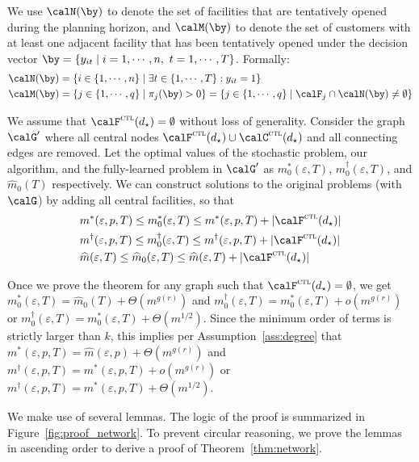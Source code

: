 \documentclass[blindrev]{informs3noheader}
\begin{document}
We use $\calN(\by)$ to denote the set of facilities that are tentatively opened during the planning horizon, and $\calM(\by)$ to denote the set of customers with at least one adjacent facility that has been tentatively opened under the decision vector $\by=\{y_{it}\mid i=1,\cdots,n,\ t=1,\cdots,T\}$. Formally:
\begin{align*}
\calN(\by)&=\{i\in\{1,\cdots,n\} \mid \exists t\in\{1,\cdots,T\}:y_{it}=1\}\\
\calM(\by)&=\{j\in\{1,\cdots,q\} \mid \pi_{j}(\by)>0\}=\left\{j\in\{1,\cdots,q\}\mid\calF_j\cap\calN(\by)\neq\emptyset\right\}
\end{align*}

We assume that $\calF^\textsc{ctl}(d_\star)=\emptyset$ without loss of generality. Consider the graph $\calG'$ where all central nodes $\calF^\textsc{ctl}(d_\star)\cup \calC^\textsc{ctl}(d_\star)$ and all connecting edges are removed. Let the optimal values of the stochastic problem, our algorithm, and the fully-learned problem in $\calG'$ as $m_0^*(\varepsilon, T)$, $m_0^\dagger(\varepsilon, T)$, and $\widehat{m}_0(T)$ respectively. We can construct solutions to the original problems (with $\calG$) by adding all central facilities, so that
\begin{align*}
& m^*(\varepsilon, p,T)\leq m_0^*(\varepsilon, T)\leq m^*(\varepsilon, p,T)+|\calF^\textsc{ctl}(d_\star)|\\
& m^\dagger(\varepsilon, p,T)\leq m_0^\dagger(\varepsilon, T)\leq m^\dagger(\varepsilon, p,T)+|\calF^\textsc{ctl}(d_\star)|\\
& \widehat{m}(\varepsilon, T)\leq \widehat{m}_0(\varepsilon, T)\leq \widehat{m}(\varepsilon, T)+|\calF^\textsc{ctl}(d_\star)|
\end{align*}

Once we prove the theorem for any graph such that $\calF^\textsc{ctl}(d_\star)=\emptyset$, we get $m_0^*(\varepsilon, T)=\widehat{m}_0(T)+\Theta\left(m^{g(r)}\right)$ and $m_0^\dagger(\varepsilon, T)=m_0^*(\varepsilon, T)+o\left(m^{g(r)}\right)$ or $m_0^\dagger(\varepsilon, T)=m_0^*(\varepsilon, T)+\Theta\left(m^{1/2}\right)$. Since the minimum order of terms is strictly larger than $k$, this implies per Assumption~\ref{ass:degree} that $m^*(\varepsilon, p,T)=\widehat{m}(\varepsilon,p)+\Theta\left(m^{g(r)}\right)$ and $m^\dagger(\varepsilon, p,T)=m^*(\varepsilon, p,T)+o\left(m^{g(r)}\right)$ or $m^\dagger(\varepsilon, p,T)=m^*(\varepsilon, p,T)+\Theta\left(m^{1/2}\right)$.

We make use of several lemmas. The logic of the proof is summarized in Figure~\ref{fig:proof_network}. To prevent circular reasoning, we prove the lemmas in ascending order to derive a proof of Theorem~\ref{thm:network}.
\end{document}
